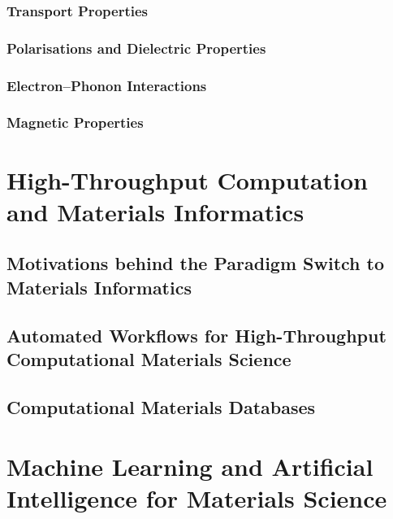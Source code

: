 \documentclass[%
aip,
rmp,
10pt, 
amsmath,
amssymb,
floatfix,
nofootinbib,
]{revtex4-2}
\begin{document}
\subsubsection{Transport Properties}


\subsubsection{Polarisations and Dielectric Properties}


\subsubsection{Electron--Phonon Interactions}\label{sec:eph_coupling}


\subsubsection{Magnetic Properties}
\label{sec:mag_prop}


\section{High-Throughput Computation and Materials Informatics}\label{chapter:high-throughput}

\subsection{Motivations behind the Paradigm Switch to Materials Informatics}


\subsection{Automated Workflows for High-Throughput Computational Materials Science}


\subsection{Computational Materials Databases}



\section{Machine Learning and Artificial Intelligence for Materials Science}
\label{sect:ML_AI_Mat_Sci} 
\end{document}
